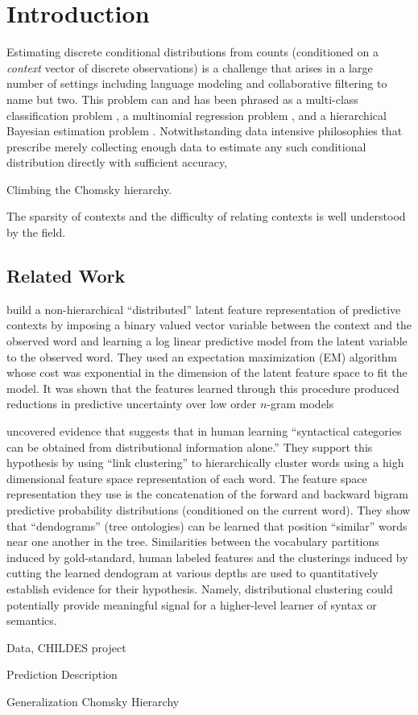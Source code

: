 \section{Introduction}

Estimating discrete conditional distributions from counts (conditioned on a {\em context} vector of discrete observations) is a challenge that arises in a large number of settings including language modeling and collaborative filtering to name but two.  This problem can and has been phrased as a multi-class classification problem \cite{}, a multinomial regression problem \cite{}, and a hierarchical Bayesian estimation problem \cite{Teh2006b}.   Notwithstanding data intensive philosophies that prescribe merely collecting enough data to estimate any such conditional distribution directly with sufficient accuracy, 

Climbing the Chomsky hierarchy.

The sparsity of contexts and the difficulty of relating contexts is well understood by the field.  

\subsection{Related Work}

\citet{Blitzer2005} build a non-hierarchical ``distributed'' latent feature representation of predictive contexts by imposing a binary valued vector variable between the context and the observed word and learning a log linear predictive model from the latent variable to the observed word.  They used an expectation maximization (EM) algorithm whose cost was exponential in the dimension of the latent feature space to fit the model.  It was shown that the features learned through this procedure produced reductions in predictive uncertainty over low order $n$-gram models 


\citet{Redington1998} uncovered evidence that suggests that in human learning ``syntactical categories can be obtained from distributional information alone.''  They support this hypothesis by using ``link clustering'' to hierarchically cluster words using a high dimensional feature space representation of each word.  The feature space representation they use is the concatenation of the forward and backward bigram predictive probability distributions (conditioned on the current word).   They show that ``dendograms'' (tree ontologies) can be learned that position ``similar'' words near one another in the tree.  Similarities between the vocabulary partitions induced by gold-standard, human labeled features and the clusterings induced by cutting the learned dendogram at various depths are used to quantitatively establish evidence for their hypothesis.   Namely, distributional clustering could potentially provide meaningful signal for a higher-level learner of syntax or semantics. 

Data, CHILDES project \cite{MacWhinney2000}

Prediction
Description

Generalization
Chomsky Hierarchy
